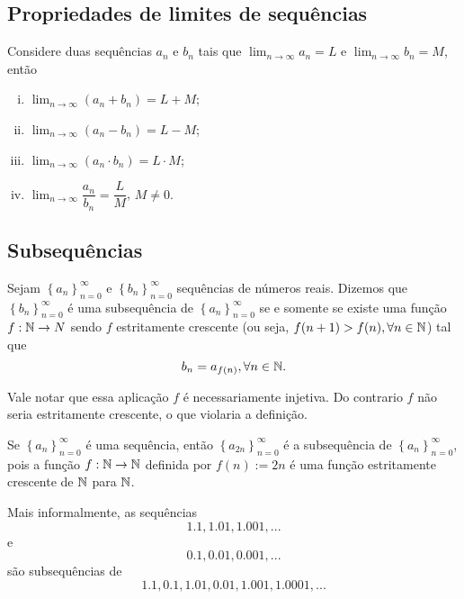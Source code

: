    \subsection{Propriedades de limites de sequências}
   \begin{stat}
      Considere duas sequências ${a_{n}}$ e ${b_{n}}$ 
      tais que $\lim_{n\to\infty} a_{n} = 
      L$ e $\lim_{n\to\infty} b_{n} = M$, então
      \begin{enumerate}[i.]
         \item $\lim_{n\to\infty} (a_{n} + b_{n}) = L + M$;
         \item $\lim_{n\to\infty} (a_{n} - b_{n}) = L - M$;
         \item $\lim_{n\to\infty} (a_{n} \cdot b_{n}) = L \cdot M$;
         \item $\lim_{n\to\infty}\dfrac{a_{n}}{b_{n}} = \dfrac{L}{M}$, $M \neq 0.$
      \end{enumerate}
   \end{stat}
   \subsection{Subsequências}
      \begin{definition}[Subsequências]
         Sejam $\left\{a_{n}\right\}^{\infty}_{n=0}$ e 
         $\left\{b_{n}\right\}^{\infty}_{n=0}$ sequências de 
         números reais. Dizemos que $\left\{b_{n}\right\}^{\infty}_{n=0}$ 
         é uma subsequência de $\left\{a_{n}\right\}^{\infty}_{n=0}$ 
         se e somente se existe uma função $f: \mathbb{N} \to N$ 
         sendo $f$ estritamente crescente (ou seja, 
         $f(n+1) > f(n), \forall n \in \mathbb{N}$) tal que 
         $$b_{n} = a_{f(n)}, \forall n \in \mathbb{N}.$$
      \end{definition}
      Vale notar que essa aplicação $f$ é necessariamente injetiva.
      Do contrario $f$ não seria estritamente crescente, o que violaria 
      a definição.
      \begin{exmp}
         Se $\left\{a_{n}\right\}^{\infty}_{n=0}$ é uma sequência, então 
         $\left\{a_{2n}\right\}^{\infty}_{n=0}$ é a subsequência de 
         $\left\{a_{n}\right\}^{\infty}_{n=0}$, pois a função 
         $f: \mathbb{N} \to \mathbb{N}$ definida por $f(n):=2n$ é uma função 
         estritamente crescente de $\mathbb{N}$ para $\mathbb{N}$.
      \end{exmp}
      \begin{exmp}
         Mais informalmente, as sequências $$1.1,1.01,1.001,...$$ 
         e $$ 0.1,0.01,0.001,...$$ são subsequências de 
         $$1.1,0.1,1.01,0.01,1.001,1.0001,...$$
      \end{exmp}

